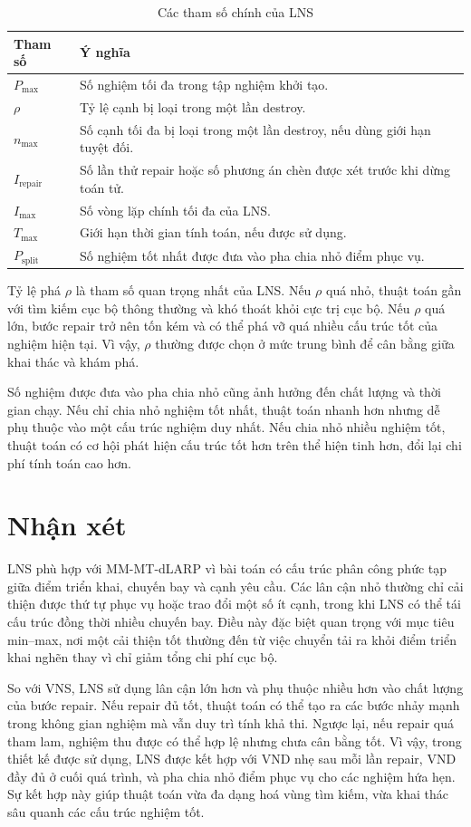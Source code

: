 \begin{table}[H]
\centering
\caption{Các tham số chính của LNS}
\label{tab:lns-parameters}
\begin{tabular}{p{3cm}p{9cm}}
\toprule
\textbf{Tham số} & \textbf{Ý nghĩa} \\
\midrule
$P_{\max}$ & Số nghiệm tối đa trong tập nghiệm khởi tạo. \\
$\rho$ & Tỷ lệ cạnh bị loại trong một lần destroy. \\
$n_{\max}$ & Số cạnh tối đa bị loại trong một lần destroy, nếu dùng giới hạn tuyệt đối. \\
$I_{\text{repair}}$ & Số lần thử repair hoặc số phương án chèn được xét trước khi dừng toán tử. \\
$I_{\max}$ & Số vòng lặp chính tối đa của LNS. \\
$T_{\max}$ & Giới hạn thời gian tính toán, nếu được sử dụng. \\
$P_{\text{split}}$ & Số nghiệm tốt nhất được đưa vào pha chia nhỏ điểm phục vụ. \\
\bottomrule
\end{tabular}
\end{table}

Tỷ lệ phá $\rho$ là tham số quan trọng nhất của LNS. Nếu $\rho$ quá nhỏ, thuật toán gần với tìm kiếm cục bộ thông thường và khó thoát khỏi cực trị cục bộ. Nếu $\rho$ quá lớn, bước repair trở nên tốn kém và có thể phá vỡ quá nhiều cấu trúc tốt của nghiệm hiện tại. Vì vậy, $\rho$ thường được chọn ở mức trung bình để cân bằng giữa khai thác và khám phá.

Số nghiệm được đưa vào pha chia nhỏ cũng ảnh hưởng đến chất lượng và thời gian chạy. Nếu chỉ chia nhỏ nghiệm tốt nhất, thuật toán nhanh hơn nhưng dễ phụ thuộc vào một cấu trúc nghiệm duy nhất. Nếu chia nhỏ nhiều nghiệm tốt, thuật toán có cơ hội phát hiện cấu trúc tốt hơn trên thể hiện tinh hơn, đổi lại chi phí tính toán cao hơn.

\section{Nhận xét}
\label{sec:lns-discussion}

LNS phù hợp với MM-MT-dLARP vì bài toán có cấu trúc phân công phức tạp giữa điểm triển khai, chuyến bay và cạnh yêu cầu. Các lân cận nhỏ thường chỉ cải thiện được thứ tự phục vụ hoặc trao đổi một số ít cạnh, trong khi LNS có thể tái cấu trúc đồng thời nhiều chuyến bay. Điều này đặc biệt quan trọng với mục tiêu min--max, nơi một cải thiện tốt thường đến từ việc chuyển tải ra khỏi điểm triển khai nghẽn thay vì chỉ giảm tổng chi phí cục bộ.

So với VNS, LNS sử dụng lân cận lớn hơn và phụ thuộc nhiều hơn vào chất lượng của bước repair. Nếu repair đủ tốt, thuật toán có thể tạo ra các bước nhảy mạnh trong không gian nghiệm mà vẫn duy trì tính khả thi. Ngược lại, nếu repair quá tham lam, nghiệm thu được có thể hợp lệ nhưng chưa cân bằng tốt. Vì vậy, trong thiết kế được sử dụng, LNS được kết hợp với VND nhẹ sau mỗi lần repair, VND đầy đủ ở cuối quá trình, và pha chia nhỏ điểm phục vụ cho các nghiệm hứa hẹn. Sự kết hợp này giúp thuật toán vừa đa dạng hoá vùng tìm kiếm, vừa khai thác sâu quanh các cấu trúc nghiệm tốt.